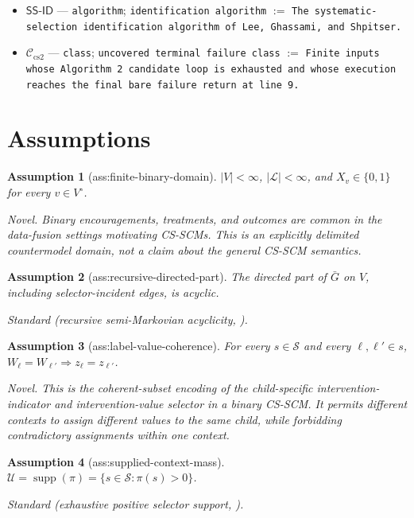 \documentclass{article}
\newtheorem{assumption}{Assumption}
\begin{document}
\begin{itemize}
  \item \(\mathsf{SS\text{-}ID}\) --- \texttt{algorithm}; \texttt{identification algorithm} $:=$ \texttt{The systematic-selection identification algorithm of Lee, Ghassami, and Shpitser.}
  \item \(\mathcal C_{\mathrm{cs2}}\) --- \texttt{class}; \texttt{uncovered terminal failure class} $:=$ \texttt{Finite inputs whose Algorithm 2 candidate loop is exhausted and whose execution reaches the final bare failure return at line 9.}
\end{itemize}

\section{Assumptions}

\begin{assumption}[ass:finite-binary-domain]\label{ass:finite-binary-domain}
\(|V|<\infty\), \(|\mathcal L|<\infty\), and \(X_v\in\{0,1\}\) for every \(v\in V^\circ\).
\par\smallskip\noindent\emph{Novel.} Binary encouragements, treatments, and outcomes are common in the data-fusion settings motivating CS-SCMs. This is an explicitly delimited countermodel domain, not a claim about the general CS-SCM semantics.
\end{assumption}

\begin{assumption}[ass:recursive-directed-part]\label{ass:recursive-directed-part}
The directed part of \(\bar G\) on \(V\), including selector-incident edges, is acyclic.
\par\smallskip\noindent\emph{Standard} (recursive semi-Markovian acyclicity, \cite{ShpitserPearl2006Joint}).
\end{assumption}

\begin{assumption}[ass:label-value-coherence]\label{ass:label-value-coherence}
For every \(s\in\mathcal S\) and every \(\ell,\ell'\in s\), \(W_\ell=W_{\ell'}\Rightarrow z_\ell=z_{\ell'}\).
\par\smallskip\noindent\emph{Novel.} This is the coherent-subset encoding of the child-specific intervention-indicator and intervention-value selector in a binary CS-SCM. It permits different contexts to assign different values to the same child, while forbidding contradictory assignments within one context.
\end{assumption}

\begin{assumption}[ass:supplied-context-mass]\label{ass:supplied-context-mass}
\(\mathcal U=\operatorname{supp}(\pi)=\{s\in\mathcal S:\pi(s)>0\}\).
\par\smallskip\noindent\emph{Standard} (exhaustive positive selector support, \cite{LeeGhassamiShpitser2024Systematic}).
\end{assumption}
\end{document}
